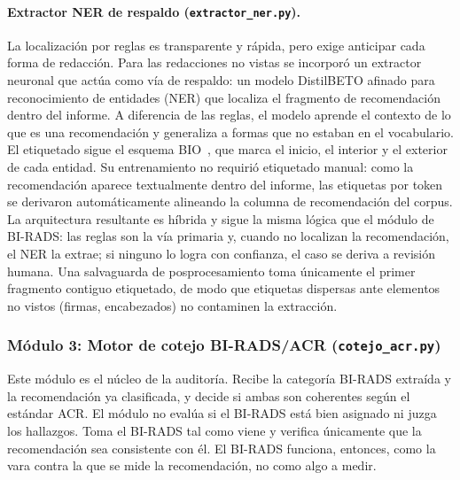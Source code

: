 \documentclass[10pt,journal,a4paper]{IEEEtran}
\newcommand{\codename}[1]{\texttt{#1}}
\begin{document}
\paragraph{Extractor NER de respaldo (\codename{extractor\_ner.py}).}
La localizaci\'on por reglas es transparente y r\'apida, pero exige anticipar cada forma de redacci\'on. Para las redacciones no vistas se incorpor\'o un extractor neuronal que act\'ua como v\'ia de respaldo: un modelo DistilBETO afinado para reconocimiento de entidades (NER) que localiza el fragmento de recomendaci\'on dentro del informe. A diferencia de las reglas, el modelo aprende el contexto de lo que es una recomendaci\'on y generaliza a formas que no estaban en el vocabulario. El etiquetado sigue el esquema BIO~\cite{ramshaw1995text}, que marca el inicio, el interior y el exterior de cada entidad. Su entrenamiento no requiri\'o etiquetado manual: como la recomendaci\'on aparece textualmente dentro del informe, las etiquetas por token se derivaron autom\'aticamente alineando la columna de recomendaci\'on del corpus. La arquitectura resultante es h\'ibrida y sigue la misma l\'ogica que el m\'odulo de BI-RADS: las reglas son la v\'ia primaria y, cuando no localizan la recomendaci\'on, el NER la extrae; si ninguno lo logra con confianza, el caso se deriva a revisi\'on humana. Una salvaguarda de posprocesamiento toma \'unicamente el primer fragmento contiguo etiquetado, de modo que etiquetas dispersas ante elementos no vistos (firmas, encabezados) no contaminen la extracci\'on.

\subsubsection{M\'odulo 3: Motor de cotejo BI-RADS/ACR (\codename{cotejo\_acr.py})}
Este m\'odulo es el n\'ucleo de la auditor\'ia. Recibe la categor\'ia BI-RADS extra\'ida y la recomendaci\'on ya clasificada, y decide si ambas son coherentes seg\'un el est\'andar ACR. El m\'odulo no eval\'ua si el BI-RADS est\'a bien asignado ni juzga los hallazgos. Toma el BI-RADS tal como viene y verifica \'unicamente que la recomendaci\'on sea consistente con \'el. El BI-RADS funciona, entonces, como la vara contra la que se mide la recomendaci\'on, no como algo a medir.
\end{document}
